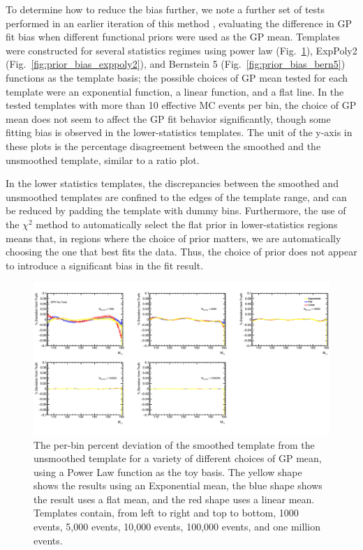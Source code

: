 To determine how to reduce the bias further, we note a further set of tests performed in an earlier iteration of this method \cite{Hyneman}, evaluating the difference in GP fit bias when different functional priors were used as the GP mean. Templates were constructed for several statistics regimes using power law (Fig.~\ref{fig:prior_bias_powerlaw}), ExpPoly2 (Fig.~\ref{fig:prior_bias_exppoly2}), and Bernstein 5 (Fig.~\ref{fig:prior_bias_bern5}) functions as the template basis; the possible choices of GP mean tested for each template were an exponential function, a linear function, and a flat line. In the tested templates with more than 10 effective MC events per bin, the choice of GP mean does not seem to affect the GP fit behavior significantly, though some fitting bias is observed in the lower-statistics templates. The unit of the y-axis in these plots is the percentage disagreement between the smoothed and the unsmoothed template, similar to a ratio plot.

In the lower statistics templates, the discrepancies between the smoothed and unsmoothed templates are confined to the edges of the template range, and can be reduced by padding the template with dummy bins. Furthermore, the use of the $\chi^2$ method to automatically select the flat prior in lower-statistics regions means that, in regions where the choice of prior matters, we are automatically choosing the one that best fits the data. Thus, the choice of prior does not appear to introduce a significant bias in the fit result. 

\begin{figure} 
\begin{center}
  \includegraphics[width=\textwidth]{figures/background/gpr/checkBiasFromPriorChoice/Plots_GPR_PriorBiases_PowerLaw_crop}   
  \caption{The per-bin percent deviation of the smoothed template from the unsmoothed template for a variety of different choices of GP mean, using a Power Law function as the toy basis. The yellow shape shows the results using an Exponential mean, the blue shape shows the result uses a flat mean, and the red shape uses a linear mean. Templates contain, from left to right and top to bottom, 1000 events, 5,000 events, 10,000 events, 100,000 events, and one million events.}
\label{fig:prior_bias_powerlaw}
\end{center}
\end{figure}

